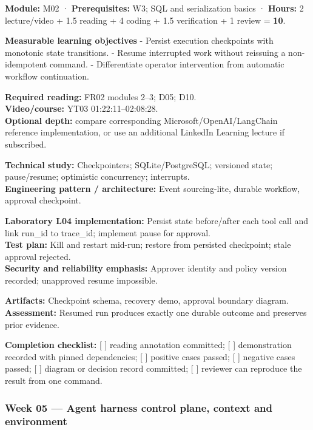 \documentclass[
  10pt,
]{article}
\begin{document}
\textbf{Module:} M02 · \textbf{Prerequisites:} W3; SQL and serialization
basics · \textbf{Hours:} 2 lecture/video + 1.5 reading + 4 coding + 1.5
verification + 1 review = \textbf{10}.

\textbf{Measurable learning objectives} - Persist execution checkpoints
with monotonic state transitions. - Resume interrupted work without
reissuing a non-idempotent command. - Differentiate operator
intervention from automatic workflow continuation.

\textbf{Required reading:} FR02 modules 2--3; D05; D10.\\
\textbf{Video/course:} YT03 01:22:11--02:08:28.\\
\textbf{Optional depth:} compare corresponding
Microsoft/OpenAI/LangChain reference implementation, or use an
additional LinkedIn Learning lecture if subscribed.

\textbf{Technical study:} Checkpointers; SQLite/PostgreSQL; versioned
state; pause/resume; optimistic concurrency; interrupts.\\
\textbf{Engineering pattern / architecture:} Event sourcing-lite,
durable workflow, approval checkpoint.

\textbf{Laboratory L04 implementation:} Persist state before/after each
tool call and link run\_id to trace\_id; implement pause for approval.\\
\textbf{Test plan:} Kill and restart mid-run; restore from persisted
checkpoint; stale approval rejected.\\
\textbf{Security and reliability emphasis:} Approver identity and policy
version recorded; unapproved resume impossible.

\textbf{Artifacts:} Checkpoint schema, recovery demo, approval boundary
diagram.\\
\textbf{Assessment:} Resumed run produces exactly one durable outcome
and preserves prior evidence.

\textbf{Completion checklist:} {[} {]} reading annotation committed; {[}
{]} demonstration recorded with pinned dependencies; {[} {]} positive
cases passed; {[} {]} negative cases passed; {[} {]} diagram or decision
record committed; {[} {]} reviewer can reproduce the result from one
command.

\subsubsection{Week 05 --- Agent harness control plane, context and
environment}\label{week-05-agent-harness-control-plane-context-and-environment}
\end{document}
